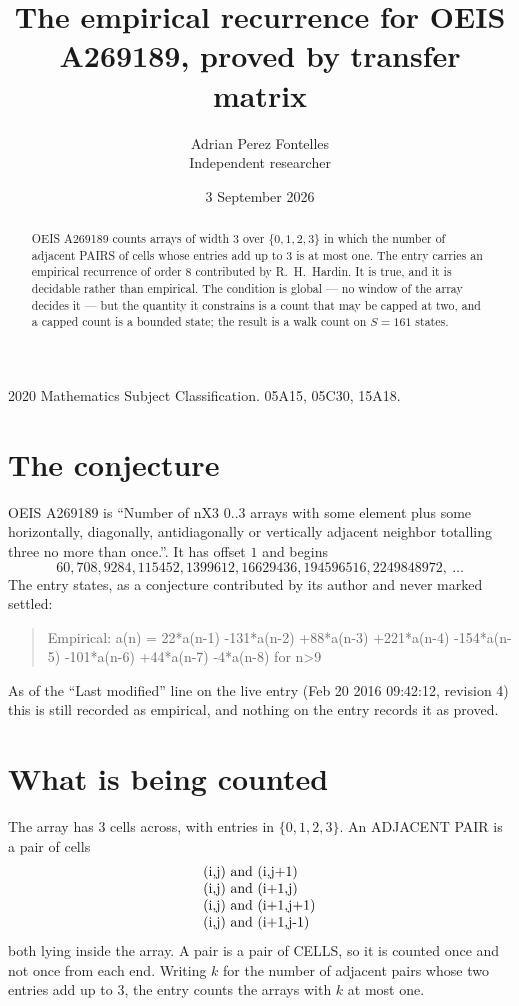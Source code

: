 \documentclass[11pt,a4paper]{article}
\title{The empirical recurrence for OEIS A269189, proved by transfer matrix}
\author{Adrian Perez Fontelles\\ \small Independent researcher}
\date{3 September 2026}
\theoremstyle{plain}
\theoremstyle{definition}
\begin{document}
\maketitle

\begin{abstract}
OEIS A269189 counts arrays of width $3$ over $\{0,1,2,3\}$ in which the number of adjacent PAIRS of
cells whose entries add up to $3$ is at most one. The entry carries an empirical recurrence of
order $8$ contributed by R.~H.~Hardin. It is true, and it is decidable rather than
empirical. The condition is global --- no window of the array decides it --- but the quantity
it constrains is a count that may be capped at two, and a capped count is a bounded state; the
result is a walk count on $S=161$ states.
\end{abstract}

\noindent\small 2020 Mathematics Subject Classification. 05A15, 05C30, 15A18.\normalsize

\section{The conjecture}

OEIS A269189 is ``Number of nX3 0..3 arrays with some element plus some horizontally, diagonally, antidiagonally or vertically adjacent neighbor totalling three no more than once.''. It has offset $1$ and begins
\[
60, 708, 9284, 115452, 1399612, 16629436, 194596516, 2249848972,\ \dots
\]
The entry states, as a conjecture contributed by its author and never marked settled:
\begin{quote}
Empirical: a(n) = 22*a(n-1) -131*a(n-2) +88*a(n-3) +221*a(n-4) -154*a(n-5) -101*a(n-6) +44*a(n-7) -4*a(n-8) for n>9
\end{quote}
As of the ``Last modified'' line on the live entry (Feb 20 2016 09:42:12, revision 4) this is still
recorded as empirical, and nothing on the entry records it as proved.

\section{What is being counted}

The array has $3$ cells across, with entries in $\{0,1,2,3\}$. An ADJACENT PAIR is a pair of cells
\[
\begin{array}{l}
$(i,j)\text{ and }(i,j{+}1)$ \\
$(i,j)\text{ and }(i{+}1,j)$ \\
$(i,j)\text{ and }(i{+}1,j{+}1)$ \\
$(i,j)\text{ and }(i{+}1,j{-}1)$ \\
\end{array}
\]
both lying inside the array. A pair is a pair of CELLS, so it is counted once and not once from
each end. Writing $k$ for the number of adjacent pairs whose two entries add up to $3$, the
entry counts the arrays with $k$ at most one.
\end{document}
